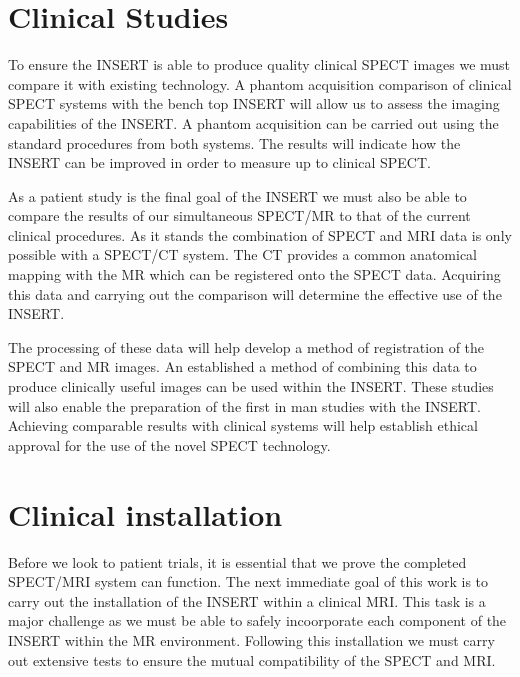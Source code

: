 \section{Clinical Studies}
To ensure the \acrshort{INSERT} is able to produce quality clinical \acrshort{SPECT} images we must compare it with existing technology. A phantom acquisition comparison of clinical \acrshort{SPECT} systems with the bench top \acrshort{INSERT} will allow us to assess the imaging capabilities of the INSERT. A phantom acquisition can be carried out using the standard procedures from both systems. The results will indicate how the \acrshort{INSERT} can be improved in order to measure up to clinical \acrshort{SPECT}.

As a patient study is the final goal of the \acrshort{INSERT} we must also be able to compare the results of our simultaneous \acrshort{SPECT/MR} to that of the current clinical procedures. As it stands the combination of \acrshort{SPECT} and \acrshort{MRI} data is only possible with a \acrshort{SPECT/CT} system. The \acrshort{CT} provides a common anatomical mapping with the \acrshort{MR} which can be registered onto the \acrshort{SPECT} data. Acquiring this data and carrying out the comparison will determine the effective use of the \acrshort{INSERT}. 

The processing of these data will help develop a method of registration of the \acrshort{SPECT} and \acrshort{MR} images. An established a method of combining this data to produce clinically useful images can be used within the \acrshort{INSERT}. These studies will also enable the preparation of the first in man studies with the \acrshort{INSERT}. Achieving comparable results with clinical systems will help establish ethical approval for the use of the novel \acrshort{SPECT} technology. 

\section{Clinical installation}
Before we look to patient trials, it is essential that we prove the completed \acrshort{SPECT/MRI} system can function. The next immediate goal of this work is to carry out the installation of the \acrshort{INSERT} within a clinical \acrshort{MRI}. This task is a major challenge as we must be able to safely incoorporate each component of the \acrshort{INSERT} within the \acrshort{MR} environment. Following this installation we must carry out extensive tests to ensure the mutual compatibility of the \acrshort{SPECT} and \acrshort{MRI}. 

